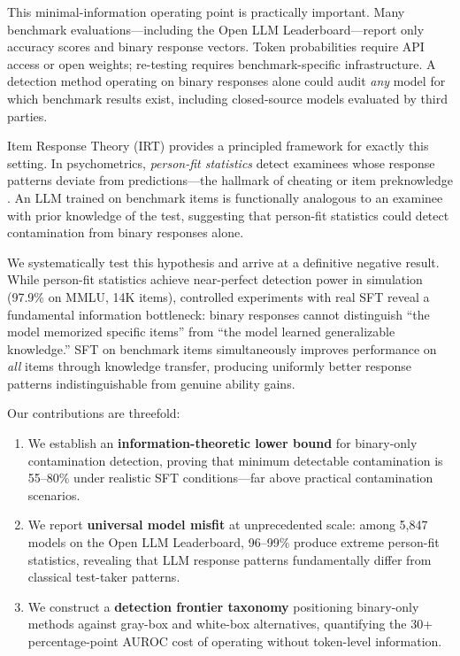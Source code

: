 \documentclass[11pt,a4paper]{article}
\begin{document}
This minimal-information operating point is practically important.
Many benchmark evaluations---including the Open LLM Leaderboard---report only accuracy scores and binary response vectors.
Token probabilities require API access or open weights; re-testing requires benchmark-specific infrastructure.
A detection method operating on binary responses alone could audit \emph{any} model for which benchmark results exist, including closed-source models evaluated by third parties.

Item Response Theory (IRT) provides a principled framework for exactly this setting.
In psychometrics, \emph{person-fit statistics} detect examinees whose response patterns deviate from predictions---the hallmark of cheating or item preknowledge \cite{meijer2001person,karabatsos2003comparing}.
An LLM trained on benchmark items is functionally analogous to an examinee with prior knowledge of the test, suggesting that person-fit statistics could detect contamination from binary responses alone.

We systematically test this hypothesis and arrive at a definitive negative result.
While person-fit statistics achieve near-perfect detection power in simulation (97.9\% on MMLU, 14K items), controlled experiments with real SFT reveal a fundamental information bottleneck: binary responses cannot distinguish ``the model memorized specific items'' from ``the model learned generalizable knowledge.''
SFT on benchmark items simultaneously improves performance on \emph{all} items through knowledge transfer, producing uniformly better response patterns indistinguishable from genuine ability gains.

Our contributions are threefold:
\begin{enumerate}
\item We establish an \textbf{information-theoretic lower bound} for binary-only contamination detection, proving that minimum detectable contamination is 55--80\% under realistic SFT conditions---far above practical contamination scenarios.
\item We report \textbf{universal model misfit} at unprecedented scale: among 5{,}847 models on the Open LLM Leaderboard, 96--99\% produce extreme person-fit statistics, revealing that LLM response patterns fundamentally differ from classical test-taker patterns.
\item We construct a \textbf{detection frontier taxonomy} positioning binary-only methods against gray-box and white-box alternatives, quantifying the 30+ percentage-point AUROC cost of operating without token-level information.
\end{enumerate}
\end{document}
